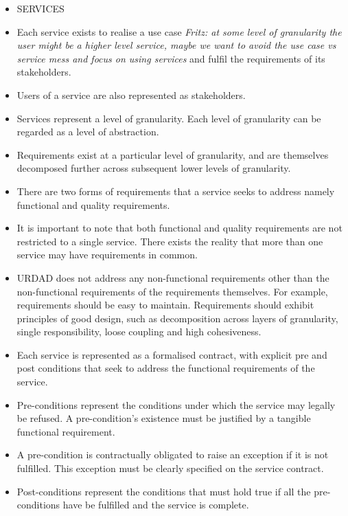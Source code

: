 \begin{itemize}
\begin{itemize}
\begin{itemize}
					
				\item SERVICES
					\item Each service exists to realise a use case 
{\em Fritz: at some level of granularity the user might be a higher level service, maybe we want to avoid the use case vs service mess and focus on using services} and fulfil the requirements of its stakeholders.
					\item Users of a service are also represented as stakeholders.
					\item Services represent a level of granularity. Each level of granularity can be regarded as a level of abstraction.
					\item Requirements exist at a particular level of granularity, and are themselves decomposed further across subsequent lower levels of granularity.
					\item There are two forms of requirements that a service seeks to address namely functional and quality requirements.
					\item It is important to note that both functional and quality requirements are not restricted to a single service. There exists the reality that more than one service may have requirements in common.
					\item URDAD does not address any non-functional requirements other than the non-functional requirements of the requirements themselves. For example, requirements should be easy to maintain. Requirements should exhibit principles of good design, such as decomposition across layers of granularity, single responsibility, loose coupling and high cohesiveness.
					\item Each service is represented as a formalised contract, with explicit pre and post conditions that seek to address the functional requirements of the service.
					\item Pre-conditions represent the conditions under which the service may legally be refused. A pre-condition's existence must be justified by a tangible functional requirement. 
					\item A pre-condition is contractually obligated to raise an exception if it is not fulfilled. This exception must be clearly specified on the service contract.
					\item Post-conditions represent the conditions that must hold true if all the pre-conditions have be fulfilled and the service is complete.
			
			
			

\end{itemize}
\end{itemize}
\end{itemize}
